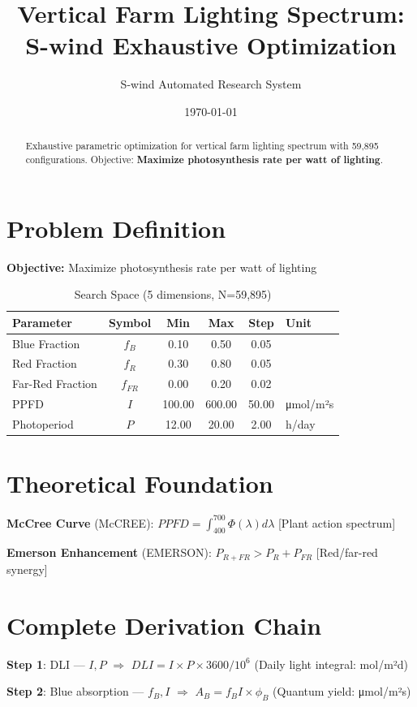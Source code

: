 \documentclass[11pt,twocolumn]{article}
\title{Vertical Farm Lighting Spectrum: \\S-wind Exhaustive Optimization}
\author{S-wind Automated Research System}
\date{\today}
\begin{document}
\maketitle

\begin{abstract}
Exhaustive parametric optimization for vertical farm lighting spectrum with 59,895 configurations.
Objective: \textbf{Maximize photosynthesis rate per watt of lighting}.
\end{abstract}

\section{Problem Definition}
\textbf{Objective:} Maximize photosynthesis rate per watt of lighting

\begin{table}[h]
\centering
\caption{Search Space (5 dimensions, N=59,895)}
\begin{tabular}{@{}lccccl@{}}
\toprule
Parameter & Symbol & Min & Max & Step & Unit \\
\midrule
Blue Fraction & $f_B$ & 0.10 & 0.50 & 0.05 &  \\
Red Fraction & $f_R$ & 0.30 & 0.80 & 0.05 &  \\
Far-Red Fraction & $f_{FR}$ & 0.00 & 0.20 & 0.02 &  \\
PPFD & $I$ & 100.00 & 600.00 & 50.00 & μmol/m²s \\
Photoperiod & $P$ & 12.00 & 20.00 & 2.00 & h/day \\
\bottomrule
\end{tabular}
\end{table}

\section{Theoretical Foundation}
\textbf{McCree Curve} (McCREE): $PPFD = \int_{400}^{700} \Phi(\lambda) d\lambda$ [Plant action spectrum]

\textbf{Emerson Enhancement} (EMERSON): $P_{R+FR} > P_R + P_{FR}$ [Red/far-red synergy]


\section{Complete Derivation Chain}
\textbf{Step 1}: DLI --- $I, P$ $\Rightarrow$ $DLI = I \times P \times 3600 / 10^6$ (Daily light integral: mol/m²d)


\textbf{Step 2}: Blue absorption --- $f_B, I$ $\Rightarrow$ $A_B = f_B I \times \phi_B$ (Quantum yield: μmol/m²s)
\end{document}
